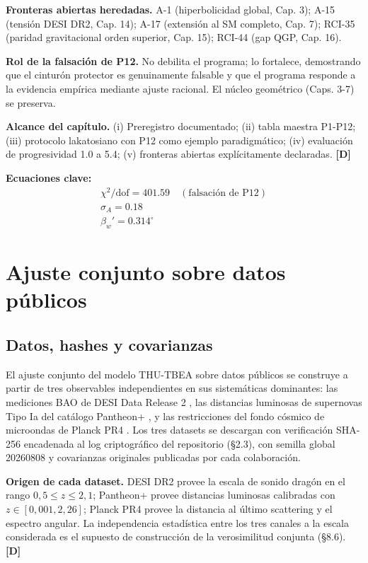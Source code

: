 ﻿\documentclass[11pt,letterpaper]{article}
\begin{document}
\textbf{Fronteras abiertas heredadas.} A-1 (hiperbolicidad global, Cap. 3); A-15 (tensión DESI DR2, Cap. 14); A-17 (extensión al SM completo, Cap. 7); RCI-35 (paridad gravitacional orden superior, Cap. 15); RCI-44 (gap QGP, Cap. 16).

\textbf{Rol de la falsación de P12.} No debilita el programa; lo fortalece, demostrando que el cinturón protector es genuinamente falsable y que el programa responde a la evidencia empírica mediante ajuste racional. El núcleo geométrico (Caps. 3-7) se preserva.

\textbf{Alcance del capítulo.} (i) Preregistro documentado; (ii) tabla maestra P1-P12; (iii) protocolo lakatosiano con P12 como ejemplo paradigmático; (iv) evaluación de progresividad 1.0 a 5.4; (v) fronteras abiertas explícitamente declaradas. \textbf{[D]}

\textbf{Ecuaciones clave:}
\begin{align*}
    \chi^2/\mathrm{dof} = 401.59 \quad (\text{falsaci\'on de P12}) \\
    \sigma_A = 0.18 \\
    \beta_w' = 0.314^\circ
\end{align*}
\section{Ajuste conjunto sobre datos públicos}
\subsection{Datos, hashes y covarianzas}
El ajuste conjunto del modelo THU-TBEA sobre datos públicos se construye a partir de tres observables independientes en sus sistemáticas dominantes: las mediciones BAO de DESI Data Release 2 \cite{Lodha2025}, las distancias luminosas de supernovas Tipo Ia del catálogo Pantheon+ \cite{Brout2022}, y las restricciones del fondo cósmico de microondas de Planck PR4 \cite{Sullivan2025}. Los tres datasets se descargan con verificación SHA-256 encadenada al log criptográfico del repositorio (§2.3), con semilla global 20260808 y covarianzas originales publicadas por cada colaboración.

\textbf{Origen de cada dataset.} DESI DR2 provee la escala de sonido dragón en el rango $0{,}5 \le z \le 2{,}1$; Pantheon+ provee distancias luminosas calibradas con $z \in [0{,}001, 2{,}26]$; Planck PR4 provee la distancia al último scattering y el espectro angular. La independencia estadística entre los tres canales a la escala considerada es el supuesto de construcción de la verosimilitud conjunta (§8.6). \textbf{[D]}
\end{document}
